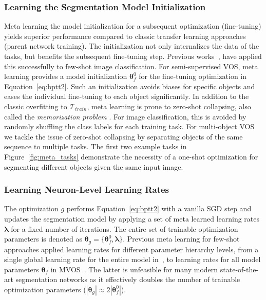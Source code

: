 \documentclass{article}
\begin{document}
    \subsubsection{Learning the Segmentation Model Initialization}
Meta learning the model initialization for a subsequent optimization (fine-tuning) yields superior performance compared to classic transfer learning approaches (parent network training).
The initialization not only internalizes the data of the tasks, but benefits the subsequent fine-tuning step.
Previous works~\cite{MAML,Meta-SGD,MVOS}, have applied this successfully to few-shot image classification.
For semi-supervised VOS, meta learning provides a model initialization $\boldsymbol \theta_f^0$ for the fine-tuning optimization in Equation~\eqref{eq:bptt2}.
Such an initialization avoids biases for specific objects and eases the individual fine-tuning to each object significantly.
In addition to the classic overfitting to $\mathcal{T}_{train}$, meta learning is prone to zero-shot collapsing, also called the \textit{memorization problem} \cite{memorization}.
For image classification, this is avoided by randomly shuffling the class labels for each training task.
For multi-object VOS we tackle the issue of zero-shot collapsing by separating objects of the same sequence to multiple tasks.
The first two example tasks in Figure~\ref{fig:meta_tasks} demonstrate the necessity of a one-shot optimization for segmenting different objects given the same input image.

    \subsubsection{Learning Neuron-Level Learning Rates}
The optimization $g$ performs Equation~\eqref{eq:bptt2} with a vanilla SGD step and updates the segmentation model by applying a set of meta learned learning rates $\boldsymbol \lambda$ for a fixed number of iterations.
The entire set of trainable optimization parameters is denoted as $\boldsymbol \theta_g = \{\boldsymbol \theta_f^0, \boldsymbol \lambda\}$. Previous meta learning for few-shot approaches applied learning rates for different parameter hierarchy levels, from a single global learning rate for the entire model in~\cite{Meta-SGD}, to learning rates for all model parameters $\boldsymbol \theta_f$ in MVOS~\cite{MVOS}.
The latter is unfeasible for many modern state-of-the-art segmentation networks as it effectively doubles the number of trainable optimization parameters ($|\boldsymbol \theta_g| \approx 2|\boldsymbol \theta_f^0|$).
\end{document}
